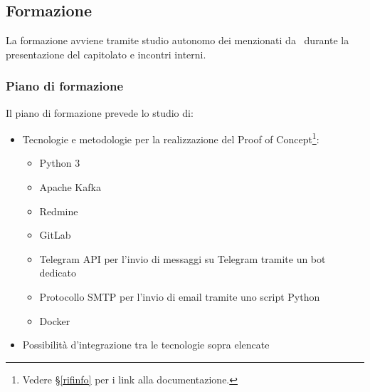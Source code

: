 	

	\subsection{Formazione}\label{Formazione}

		La formazione avviene tramite studio autonomo dei  menzionati da \II\ durante la presentazione del capitolato e incontri interni.

		\subsubsection{Piano di formazione} %
		Il piano di formazione prevede lo studio di:
		\begin{itemize}
			\item Tecnologie e metodologie per la realizzazione del Proof of Concept\footnote{Vedere \S\ref{rifinfo} per i link alla documentazione.}:
			\begin{itemize}
				\item Python 3
				\item Apache Kafka
				\item Redmine
				\item GitLab
				\item Telegram API per l'invio di messaggi su Telegram tramite un bot dedicato
				\item Protocollo SMTP per l'invio di email tramite uno script Python
				\item Docker
			\end{itemize}
			\item Possibilità d'integrazione tra le tecnologie sopra elencate
		\end{itemize}
